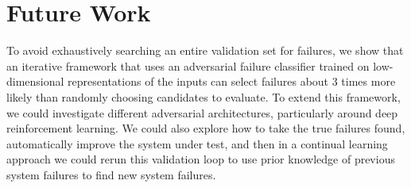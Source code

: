 \section{Future Work}
To avoid exhaustively searching an entire validation set for failures, we show that an iterative framework that uses an adversarial failure classifier trained on low-dimensional representations of the inputs can select failures about $3$ times more likely than randomly choosing candidates to evaluate.
To extend this framework, we could investigate different adversarial architectures, particularly around deep reinforcement learning.
We could also explore how to take the true failures found, automatically improve the system under test, and then in a continual learning approach we could rerun this validation loop to use prior knowledge of previous system failures to find new system failures.

